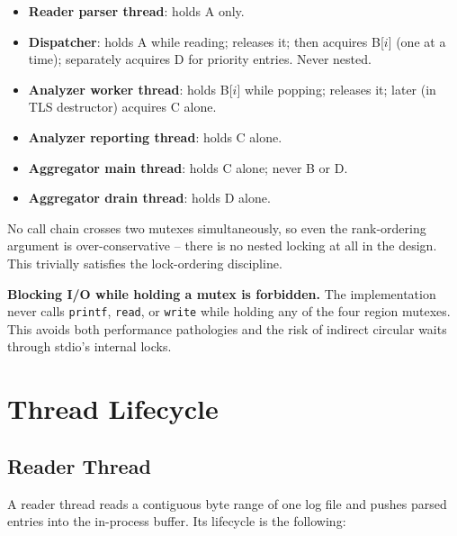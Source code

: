 \documentclass[11pt,a4paper]{article}
\newcommand{\code}[1]{\texttt{\small #1}}
\begin{document}
\begin{itemize}
    \item \textbf{Reader parser thread}: holds A only.
    \item \textbf{Dispatcher}: holds A while reading; releases it; then
        acquires B[$i$] (one at a time); separately acquires D for
        priority entries. Never nested.
    \item \textbf{Analyzer worker thread}: holds B[$i$] while popping;
        releases it; later (in TLS destructor) acquires C alone.
    \item \textbf{Analyzer reporting thread}: holds C alone.
    \item \textbf{Aggregator main thread}: holds C alone; never B or D.
    \item \textbf{Aggregator drain thread}: holds D alone.
\end{itemize}

No call chain crosses two mutexes simultaneously, so even the
rank-ordering argument is over-conservative -- there is no nested
locking at all in the design. This trivially satisfies the lock-ordering
discipline.

\begin{warnbox}
\textbf{Blocking I/O while holding a mutex is forbidden.} The
implementation never calls \code{printf}, \code{read}, or \code{write}
while holding any of the four region mutexes. This avoids both
performance pathologies and the risk of indirect circular waits through
stdio's internal locks.
\end{warnbox}

\section{Thread Lifecycle}

\subsection{Reader Thread}

A reader thread reads a contiguous byte range of one log file and pushes
parsed entries into the in-process buffer. Its lifecycle is the
following:
\end{document}
